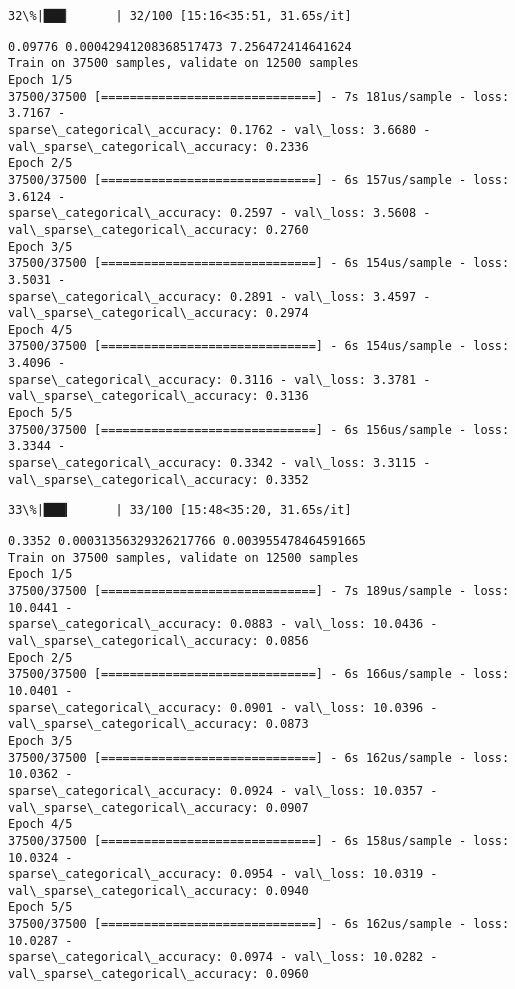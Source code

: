 \documentclass[11pt]{article}
\begin{document}
    \begin{Verbatim}[commandchars=\\\{\}]
 32\%|███▏      | 32/100 [15:16<35:51, 31.65s/it]
    \end{Verbatim}

    \begin{Verbatim}[commandchars=\\\{\}]
0.09776 0.00042941208368517473 7.256472414641624
Train on 37500 samples, validate on 12500 samples
Epoch 1/5
37500/37500 [==============================] - 7s 181us/sample - loss: 3.7167 -
sparse\_categorical\_accuracy: 0.1762 - val\_loss: 3.6680 -
val\_sparse\_categorical\_accuracy: 0.2336
Epoch 2/5
37500/37500 [==============================] - 6s 157us/sample - loss: 3.6124 -
sparse\_categorical\_accuracy: 0.2597 - val\_loss: 3.5608 -
val\_sparse\_categorical\_accuracy: 0.2760
Epoch 3/5
37500/37500 [==============================] - 6s 154us/sample - loss: 3.5031 -
sparse\_categorical\_accuracy: 0.2891 - val\_loss: 3.4597 -
val\_sparse\_categorical\_accuracy: 0.2974
Epoch 4/5
37500/37500 [==============================] - 6s 154us/sample - loss: 3.4096 -
sparse\_categorical\_accuracy: 0.3116 - val\_loss: 3.3781 -
val\_sparse\_categorical\_accuracy: 0.3136
Epoch 5/5
37500/37500 [==============================] - 6s 156us/sample - loss: 3.3344 -
sparse\_categorical\_accuracy: 0.3342 - val\_loss: 3.3115 -
val\_sparse\_categorical\_accuracy: 0.3352
    \end{Verbatim}

    \begin{Verbatim}[commandchars=\\\{\}]
 33\%|███▎      | 33/100 [15:48<35:20, 31.65s/it]
    \end{Verbatim}

    \begin{Verbatim}[commandchars=\\\{\}]
0.3352 0.00031356329326217766 0.003955478464591665
Train on 37500 samples, validate on 12500 samples
Epoch 1/5
37500/37500 [==============================] - 7s 189us/sample - loss: 10.0441 -
sparse\_categorical\_accuracy: 0.0883 - val\_loss: 10.0436 -
val\_sparse\_categorical\_accuracy: 0.0856
Epoch 2/5
37500/37500 [==============================] - 6s 166us/sample - loss: 10.0401 -
sparse\_categorical\_accuracy: 0.0901 - val\_loss: 10.0396 -
val\_sparse\_categorical\_accuracy: 0.0873
Epoch 3/5
37500/37500 [==============================] - 6s 162us/sample - loss: 10.0362 -
sparse\_categorical\_accuracy: 0.0924 - val\_loss: 10.0357 -
val\_sparse\_categorical\_accuracy: 0.0907
Epoch 4/5
37500/37500 [==============================] - 6s 158us/sample - loss: 10.0324 -
sparse\_categorical\_accuracy: 0.0954 - val\_loss: 10.0319 -
val\_sparse\_categorical\_accuracy: 0.0940
Epoch 5/5
37500/37500 [==============================] - 6s 162us/sample - loss: 10.0287 -
sparse\_categorical\_accuracy: 0.0974 - val\_loss: 10.0282 -
val\_sparse\_categorical\_accuracy: 0.0960
    \end{Verbatim}
\end{document}
